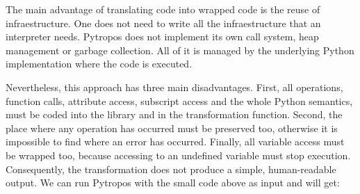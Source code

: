 The main advantage of translating code into wrapped code is the reuse of
infraestructure. One does not need to write all the infraestructure that
an interpreter needs. Pytropos does not implement its own call system,
heap management or garbage collection. All of it is managed by the
underlying Python implementation where the code is executed.

Nevertheless, this approach has three main disadvantages. First, all
operations, function calls, attribute access, subscript access and the
whole Python semantics, must be coded into the library and in the
transformation function. Second, the place where any operation has
occurred must be preserved too, otherwise it is impossible to find where
an error has occurred. Finally, all variable access must be wrapped too,
because accessing to an undefined variable must stop execution.
Consequently, the transformation does not produce a simple,
human-readable output. We can run Pytropos with the small code above as
input and will get:

\begin{Shaded}
\begin{Highlighting}[]
\OperatorTok{=}
\OperatorTok{=} 
\NormalTok{st[(}\NormalTok{, ((}\NormalTok{, }\NormalTok{), fn))] }\OperatorTok{=}\NormalTok{(}\NormalTok{(}\OperatorTok{=}\NormalTok{((}\NormalTok{, }
\NormalTok{st[(}\NormalTok{, ((}\NormalTok{, }\NormalTok{), fn))] }\OperatorTok{=}\NormalTok{ st[(}\NormalTok{, ((}\NormalTok{, }\NormalTok{), fn))].add(pt.}\NormalTok{(}\OperatorTok{=}\NormalTok{((}\NormalTok{, }
\NormalTok{st[(}\NormalTok{, ((}\NormalTok{, }\NormalTok{), fn))] }\OperatorTok{=}\NormalTok{ st[(}\NormalTok{, ((}\NormalTok{, }\NormalTok{), fn))].truediv(pt.}\NormalTok{(}\OperatorTok{=}\NormalTok{((}\NormalTok{, }
\end{Highlighting}
\end{Shaded}

